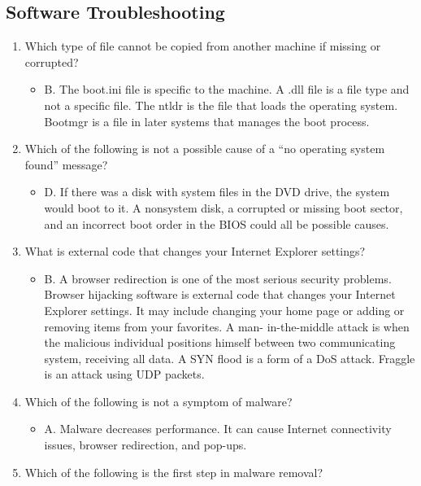\documentclass{article}
\begin{document}
\subsection{Software Troubleshooting} 
\begin{enumerate}
    \item Which type of file cannot be copied from another machine if missing or corrupted?
    \begin{itemize}
        \item B. The boot.ini file is specific to the machine. A .dll file is a file type and not a specific
file. The ntldr is the file that loads the operating system. Bootmgr is a file in later systems
that manages the boot process.
    \end{itemize}
    \item Which of the following is not a possible cause of a “no operating system found” message?
    \begin{itemize}
        \item D. If there was a disk with system files in the DVD drive, the system would boot to it.
A nonsystem disk, a corrupted or missing boot sector, and an incorrect boot order in the
BIOS could all be possible causes.
    \end{itemize}
    \item What is external code that changes your Internet Explorer settings?
    \begin{itemize}
        \item B. A browser redirection is one of the most serious security problems. Browser hijacking
software is external code that changes your Internet Explorer settings. It may include
changing your home page or adding or removing items from your favorites. A man-
in-the-middle attack is when the malicious individual positions himself between two
communicating system, receiving all data. A SYN flood is a form of a DoS attack. Fraggle is
an attack using UDP packets.
    \end{itemize}
    \item Which of the following is not a symptom of malware?
    \begin{itemize}
        \item A. Malware decreases performance. It can cause Internet connectivity issues, browser
redirection, and pop-ups.
    \end{itemize}
    \item Which of the following is the first step in malware removal?
    \begin{itemize}

\end{itemize}
\end{enumerate}
\end{document}
